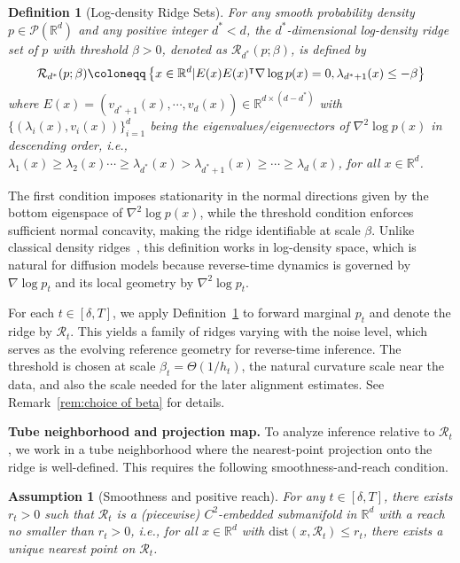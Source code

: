 \documentclass[11pt]{article}
\newcommand{\mb}{\mathbb}
\newcommand{\mc}{\mathcal}
\newtheorem{definition}{Definition}[section]
\newtheorem{assumption}{Assumption}
\begin{document}
\begin{definition}[Log-density Ridge Sets]\label{def:ridge} For any smooth probability density $p\in \mc{P}(\mb{R}^d)$ and any positive integer $d^*<d$, the $d^*$-dimensional log-density ridge set of $p$ with threshold $\beta>0$, denoted as $\mc{R}_{d^*}(p;\beta)$, is defined by
\vspace{-.1cm}
\begin{align*}
    \mc{R}_{d^*}(p;\beta)\coloneqq \left\{ x\in \mb{R}^d | E(x)E(x)^\intercal \nabla\log p(x)=0 , \lambda_{d^*+1}(x)\le -\beta \right\}
    \vspace{-.1cm}
\end{align*}
where $E(x)=(v_{d^*+1}(x),\cdots, v_d(x))\in \mb{R}^{d\times(d-d^*)}$ with $\{(\lambda_i(x),v_i(x))\}_{i=1}^d$ being the eigenvalues/eigenvectors of $\nabla^2 \log p(x)$ in descending order, i.e., $\lambda_1(x)\ge \lambda_2(x)\cdots\ge \lambda_{d^*}(x)>\lambda_{d^*+1}(x)\ge \cdots\ge \lambda_d(x)$, for all $x\in \mb{R}^d$.   
\end{definition}  
The first condition imposes stationarity in the normal directions given by the bottom eigenspace of $\nabla^2\log p(x)$, while the threshold condition enforces sufficient normal concavity, making the ridge identifiable at scale $\beta$. Unlike classical density ridges~\citep{genovese2014nonparametric,chen2015asymptotic}, this definition works in log-density space, which is natural for diffusion models because reverse-time dynamics is governed by $\nabla\log p_t$ and its local geometry by $\nabla^2\log p_t$.

For each $t\in [\delta,T]$, we apply Definition~\ref{def:ridge} to forward marginal $p_t$ and denote the ridge by $\mc{R}_t$. This yields a family of ridges varying with the noise level, which serves as the evolving reference geometry for reverse-time inference. The threshold is chosen at scale $\beta_t=\Theta(1/h_t)$, the natural curvature scale near the data, and also the scale needed for the later alignment estimates. See Remark~\ref{rem:choice of beta} for details.

\noindent\textbf{Tube neighborhood and projection map.} 
To analyze inference relative to $\mc{R}_t$, we work in a tube neighborhood where the nearest-point projection onto the ridge is well-defined. This requires the following smoothness-and-reach condition.

\begin{assumption}[Smoothness and positive reach]\label{assump:ridge set} For any $t\in [\delta, T]$, there exists $r_t>0$ such that $\mc{R}_t$ is a (piecewise) $C^2$-embedded submanifold in $\mb{R}^d$ with a reach no smaller than $r_t>0$, i.e., for all $x\in \mb{R}^d$ with $\mathrm{dist}(x,\mc{R}_t)\le r_t$, there exists a unique nearest point on $\mc{R}_t$.
\end{assumption}
\end{document}
